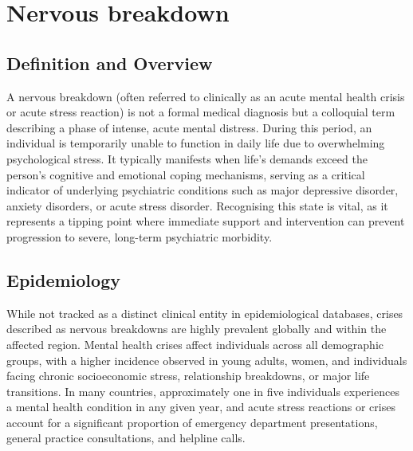 \chapter{Nervous breakdown}

\section*{Definition and Overview}
A nervous breakdown (often referred to clinically as an acute mental health crisis or acute stress reaction) is not a formal medical diagnosis but a colloquial term describing a phase of intense, acute mental distress. During this period, an individual is temporarily unable to function in daily life due to overwhelming psychological stress. It typically manifests when life's demands exceed the person's cognitive and emotional coping mechanisms, serving as a critical indicator of underlying psychiatric conditions such as major depressive disorder, anxiety disorders, or acute stress disorder. Recognising this state is vital, as it represents a tipping point where immediate support and intervention can prevent progression to severe, long-term psychiatric morbidity.

\section*{Epidemiology}
While not tracked as a distinct clinical entity in epidemiological databases, crises described as nervous breakdowns are highly prevalent globally and within the affected region. Mental health crises affect individuals across all demographic groups, with a higher incidence observed in young adults, women, and individuals facing chronic socioeconomic stress, relationship breakdowns, or major life transitions. In many countries, approximately one in five individuals experiences a mental health condition in any given year, and acute stress reactions or crises account for a significant proportion of emergency department presentations, general practice consultations, and helpline calls.

